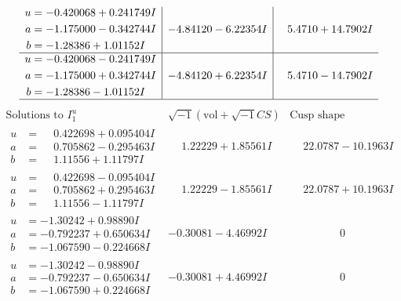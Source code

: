 \documentclass[1p]{elsarticle_modified}
\theoremstyle{definition}
\newcommand{\I}{\sqrt{-1}}
\begin{document}
$$\begin{array}{c|c|c}
\begin{aligned}
u &= -0.420068 + 0.241749 I \\
a &= -1.175000 - 0.342744 I \\
b &= -1.28386 + 1.01152 I\end{aligned}
 & -4.84120 - 6.22354 I & \phantom{-}5.4710 + 14.7902 I \\ \hline\begin{aligned}
u &= -0.420068 - 0.241749 I \\
a &= -1.175000 + 0.342744 I \\
b &= -1.28386 - 1.01152 I\end{aligned}
 & -4.84120 + 6.22354 I & \phantom{-}5.4710 - 14.7902 I\\
 \hline 
 \end{array}$$\newpage$$\begin{array}{c|c|c}  
\text{Solutions to }I^u_{1}& \I (\text{vol} + \sqrt{-1}CS) & \text{Cusp shape}\\
 \hline 
\begin{aligned}
u &= \phantom{-}0.422698 + 0.095404 I \\
a &= \phantom{-}0.705862 - 0.295463 I \\
b &= \phantom{-}1.11556 + 1.11797 I\end{aligned}
 & \phantom{-}1.22229 + 1.85561 I & \phantom{-}22.0787 - 10.1963 I \\ \hline\begin{aligned}
u &= \phantom{-}0.422698 - 0.095404 I \\
a &= \phantom{-}0.705862 + 0.295463 I \\
b &= \phantom{-}1.11556 - 1.11797 I\end{aligned}
 & \phantom{-}1.22229 - 1.85561 I & \phantom{-}22.0787 + 10.1963 I \\ \hline\begin{aligned}
u &= -1.30242 + 0.98890 I \\
a &= -0.792237 + 0.650634 I \\
b &= -1.067590 - 0.224668 I\end{aligned}
 & -0.30081 - 4.46992 I & \phantom{-0.000000 } 0 \\ \hline\begin{aligned}
u &= -1.30242 - 0.98890 I \\
a &= -0.792237 - 0.650634 I \\
b &= -1.067590 + 0.224668 I\end{aligned}
 & -0.30081 + 4.46992 I & \phantom{-0.000000 } 0 \\ \hline\begin{aligned}

\end{aligned}
\end{array}$$
\end{document}
